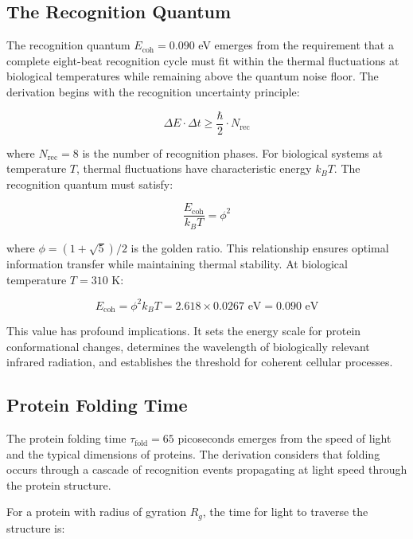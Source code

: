 \documentclass[12pt,a4paper]{report}
\begin{document}
\subsection{The Recognition Quantum}

The recognition quantum $E_{\text{coh}} = 0.090$ eV emerges from the requirement that a complete eight-beat recognition cycle must fit within the thermal fluctuations at biological temperatures while remaining above the quantum noise floor. The derivation begins with the recognition uncertainty principle:

\begin{equation}
\Delta E \cdot \Delta t \geq \frac{\hbar}{2} \cdot N_{\text{rec}}
\end{equation}

where $N_{\text{rec}} = 8$ is the number of recognition phases. For biological systems at temperature $T$, thermal fluctuations have characteristic energy $k_B T$. The recognition quantum must satisfy:

\begin{equation}
\frac{E_{\text{coh}}}{k_B T} = \phi^2
\end{equation}

where $\phi = (1 + \sqrt{5})/2$ is the golden ratio. This relationship ensures optimal information transfer while maintaining thermal stability. At biological temperature $T = 310$ K:

\begin{equation}
E_{\text{coh}} = \phi^2 k_B T = 2.618 \times 0.0267 \text{ eV} = 0.090 \text{ eV}
\end{equation}

This value has profound implications. It sets the energy scale for protein conformational changes, determines the wavelength of biologically relevant infrared radiation, and establishes the threshold for coherent cellular processes.

\subsection{Protein Folding Time}

The protein folding time $\tau_{\text{fold}} = 65$ picoseconds emerges from the speed of light and the typical dimensions of proteins. The derivation considers that folding occurs through a cascade of recognition events propagating at light speed through the protein structure.

For a protein with radius of gyration $R_g$, the time for light to traverse the structure is:
\end{document}
